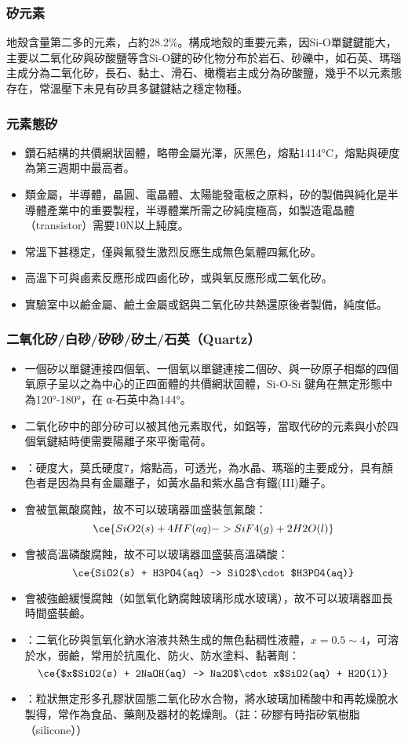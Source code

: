 \documentclass[a4paper,12pt]{report}
\begin{document}
\subsubsection{矽元素}
地殼含量第二多的元素，占約28.2\%。構成地殼的重要元素，因Si-O單鍵鍵能大，主要以二氧化矽與矽酸鹽等含Si-O鍵的矽化物分布於岩石、砂礫中，如石英、瑪瑙主成分為二氧化矽，長石、黏土、滑石、橄欖岩主成分為矽酸鹽，幾乎不以元素態存在，常溫壓下未見有矽具多鍵鍵結之穩定物種。
\subsubsection{元素態矽}
\begin{itemize}
\item 鑽石結構的共價網狀固體，略帶金屬光澤，灰黑色，熔點1414°C，熔點與硬度為第三週期中最高者。
\item 類金屬，半導體，晶圓、電晶體、太陽能發電板之原料，矽的製備與純化是半導體產業中的重要製程，半導體業所需之矽純度極高，如製造電晶體（transistor）需要10N以上純度。
\item 常溫下甚穩定，僅與氟發生激烈反應生成無色氣體四氟化矽。
\item 高溫下可與鹵素反應形成四鹵化矽，或與氧反應形成二氧化矽。
\item  實驗室中以鹼金屬、鹼土金屬或鋁與二氧化矽共熱還原後者製備，純度低。
\end{itemize}
\subsubsection{二氧化矽/白砂/矽砂/矽土/石英（Quartz）}
\begin{itemize}
\item 一個矽以單鍵連接四個氧、一個氧以單鍵連接二個矽、與一矽原子相鄰的四個氧原子呈以之為中心的正四面體的共價網狀固體，Si-O-Si 鍵角在無定形態中為120°-180°，在 α-石英中為144°。
\item 二氧化矽中的部分矽可以被其他元素取代，如鋁等，當取代矽的元素與小於四個氧鍵結時便需要陽離子來平衡電荷。
\item {}：硬度大，莫氏硬度7，熔點高，可透光，為水晶、瑪瑙的主要成分，具有顏色者是因為具有金屬離子，如黃水晶和紫水晶含有鐵(III)離子。
\item 會被氫氟酸腐蝕，故不可以玻璃器皿盛裝氫氟酸：
\[\ce{SiO2(s) + 4HF(aq) -> SiF4(g) + 2H2O(l)}\]
\item 會被高溫磷酸腐蝕，故不可以玻璃器皿盛裝高溫磷酸：
\[\ce{SiO2(s) + H3PO4(aq) -> SiO2$\cdot$H3PO4(aq)}\]
\item 會被強鹼緩慢腐蝕（如氫氧化鈉腐蝕玻璃形成水玻璃），故不可以玻璃器皿長時間盛裝鹼。
\item {}：二氧化矽與氫氧化鈉水溶液共熱生成的無色黏稠性液體，$x=0.5\sim 4$，可溶於水，弱鹼，常用於抗風化、防火、防水塗料、黏著劑：
\[\ce{$x$SiO2(s) + 2NaOH(aq) -> Na2O$\cdot x$SiO2(aq) + H2O(l)}\]
\item {}：粒狀無定形多孔膠狀固態二氧化矽水合物，將水玻璃加稀酸中和再乾燥脫水製得，常作為食品、藥劑及器材的乾燥劑。（註：矽膠有時指矽氧樹脂（silicone））
\end{itemize}
\end{document}

